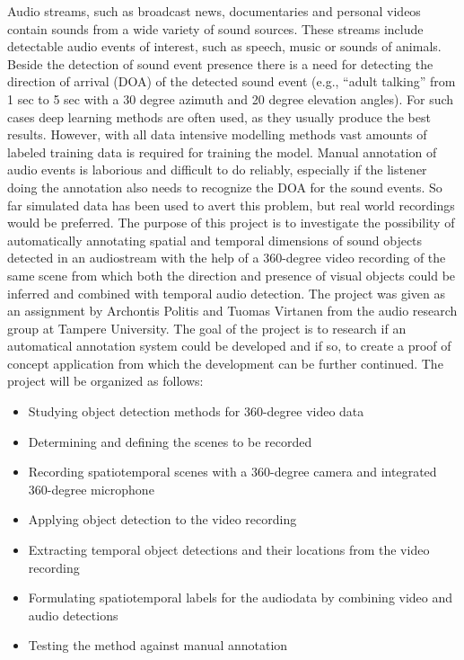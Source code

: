 Audio streams, such as broadcast news, documentaries and personal videos contain sounds from a wide variety of sound sources. These streams include detectable audio events of interest, such as speech, music or sounds of animals. Beside the detection of sound event presence there is a need for detecting the direction of arrival (DOA) of the detected sound event (e.g., “adult talking” from 1 sec to 5 sec with a 30 degree azimuth and 20 degree elevation angles). For such cases deep learning methods are often used, as they usually produce the best results. However, with all data intensive modelling methods vast amounts of labeled training data is required for training the model. Manual annotation of audio events is laborious and difficult to do reliably, especially if the listener doing the annotation also needs to recognize the DOA for the sound events. So far simulated data has been used to avert this problem, but real world recordings would be preferred. The purpose of this project is to investigate the possibility of automatically annotating spatial and temporal dimensions of sound objects detected in an audiostream with the help of a 360-degree video recording of the same scene from which both the direction and presence of visual objects could be inferred and combined with temporal audio detection. The project was given as an assignment by Archontis Politis and Tuomas Virtanen from the audio research group at Tampere University. The goal of the project is to research if an automatical annotation system could be developed and if so, to create a proof of concept application from which the development can be further continued. The project will be organized as follows:

\begin{itemize}
	\item Studying object detection methods for 360-degree video data
	\item Determining and defining the scenes to be recorded
	\item Recording spatiotemporal scenes with a 360-degree camera and integrated 360-degree microphone
	\item Applying object detection to the video recording 
	\item Extracting temporal object detections and their locations from the video recording
	\item Formulating spatiotemporal labels for the audiodata by combining video and audio detections
	\item Testing the method against manual annotation
\end{itemize}